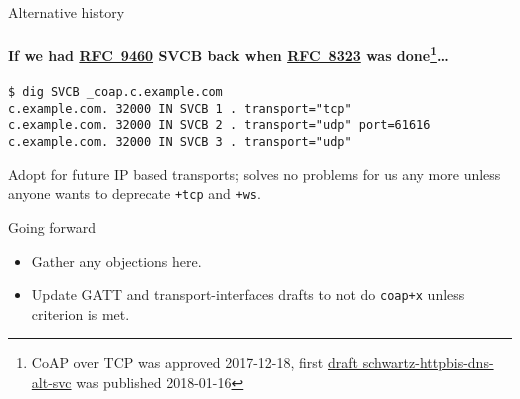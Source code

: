 \documentclass[aspectratio=169,colorlinks]{beamer}
\newcommand{\rfc}[1]{\href{https://datatracker.ietf.org/doc/html/rfc#1}{RFC~#1}}
\newcommand{\ietfdraft}[1]{\href{https://datatracker.ietf.org/doc/draft-#1/}{draft #1}}
\begin{document}
\begin{frame}{Alternative history}\large
  \framesubtitle{If we had \rfc{9460} SVCB back when \rfc{8323} was done\footnote{CoAP over TCP was approved 2017-12-18, first \ietfdraft{schwartz-httpbis-dns-alt-svc} was published 2018-01-16}…}

  \texttt{{\color{gray}\$} dig SVCB \_coap.c.example.com}\\
  \texttt{c.example.com. 32000 IN SVCB 1 . transport="tcp"}\\
  \texttt{c.example.com. 32000 IN SVCB 2 . transport="udp" port=61616}\\
  \texttt{c.example.com. 32000 IN SVCB 3 . transport="udp"}

  \bigskip

  Adopt for future IP based transports;
  solves no problems for us any more unless anyone wants to deprecate \texttt{+tcp} and \texttt{+ws}.
\end{frame}

\begin{frame}{Going forward}\Large
  \begin{itemize}
    \item Gather any objections here.
    \item Update GATT and transport-interfaces drafts to not do \texttt{coap+x} unless criterion is met.
  \end{itemize}
\end{frame}
\end{document}
